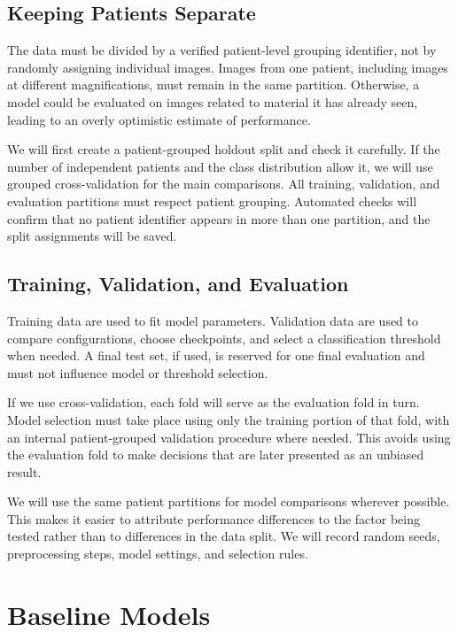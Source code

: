 \documentclass[11pt,a4paper]{article}
\begin{document}
\subsection{Keeping Patients Separate}

The data must be divided by a verified patient-level grouping identifier, not by randomly assigning individual images. Images from one patient, including images at different magnifications, must remain in the same partition. Otherwise, a model could be evaluated on images related to material it has already seen, leading to an overly optimistic estimate of performance.

We will first create a patient-grouped holdout split and check it carefully. If the number of independent patients and the class distribution allow it, we will use grouped cross-validation for the main comparisons. All training, validation, and evaluation partitions must respect patient grouping. Automated checks will confirm that no patient identifier appears in more than one partition, and the split assignments will be saved.

\subsection{Training, Validation, and Evaluation}

Training data are used to fit model parameters. Validation data are used to compare configurations, choose checkpoints, and select a classification threshold when needed. A final test set, if used, is reserved for one final evaluation and must not influence model or threshold selection.

If we use cross-validation, each fold will serve as the evaluation fold in turn. Model selection must take place using only the training portion of that fold, with an internal patient-grouped validation procedure where needed. This avoids using the evaluation fold to make decisions that are later presented as an unbiased result.

We will use the same patient partitions for model comparisons wherever possible. This makes it easier to attribute performance differences to the factor being tested rather than to differences in the data split. We will record random seeds, preprocessing steps, model settings, and selection rules.

\section{Baseline Models}
\end{document}
